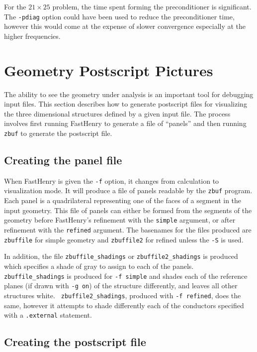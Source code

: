For the $21 \times 25$ problem, the time spent forming the
preconditioner is significant.  The {\tt -pdiag} option could have
been used to reduce the preconditioner time, however this would come
at the expense of slower convergence especially at the higher
frequencies.

\section{Geometry Postscript Pictures}
\label{postscript}

The ability to see the geometry under analysis is an important tool for
debugging input files.  This section describes how to generate
postscript files for visualizing the three dimensional structures
defined by a given input file.  The process involves first running
FastHenry to generate a file of ``panels'' and then running {\tt zbuf}
to generate the postscript file.

\subsection{Creating the panel file}

When FastHenry is given the {\tt -f} option, it changes from
calculation to visualization mode.  It will produce a file of
panels readable by the {\tt zbuf} program.  Each panel is a
quadrilateral representing one of the faces of a segment in the input
geometry.  This file of panels can either be formed from the segments
of the geometry before FastHenry's refinement 
with the {\tt simple} argument, or after refinement with the
{\tt refined} argument.  The basenames for the
files produced are {\tt zbuffile} for simple geometry and 
{\tt zbuffile2} for refined unless the {\tt -S} is used.  

In addition, the file {\tt zbuffile\_shadings} 
or {\tt zbuffile2\_shadings} is produced which specifies
a shade of gray to assign to each of the panels.  {\tt
zbuffile\_shadings} is produced for {\tt -f simple} and shades each
of the reference planes (if drawn with {\tt -g on}) of the structure
differently, and leaves all other structures white.  {\tt
zbuffile2\_shadings}, produced with {\tt -f refined}, does the same,
however it attempts to shade differently each of the conductors specified
with a {\tt .external} statement.

\subsection{Creating the postscript file}

